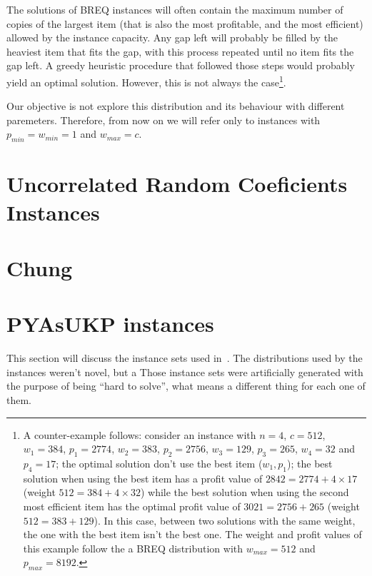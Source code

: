 The solutions of BREQ instances will often contain the maximum number of copies of the largest item (that is also the most profitable, and the most efficient) allowed by the instance capacity. Any gap left will probably be filled by the heaviest item that fits the gap, with this process repeated until no item fits the gap left. A greedy heuristic procedure that followed those steps would probably yield an optimal solution. However, this is not always the case\footnote{A counter-example follows: consider an instance with \(n = 4\), \(c = 512\), \(w_1 = 384\), \(p_1 = 2774\), \(w_2 = 383\), \(p_2 = 2756\), \(w_3 = 129\), \(p_3 = 265\), \(w_4 = 32\) and \(p_4 = 17\); the optimal solution don't use the best item (\(w_1, p_1\)); the best solution when using the best item has a profit value of \(2842 = 2774 + 4\times17\) (weight \(512 = 384 + 4\times32\)) while the best solution when using the second most efficient item has the optimal profit value of \(3021 = 2756 + 265\) (weight \(512 = 383 + 129\)). In this case, between two solutions with the same weight, the one with the best item isn't the best one. The weight and profit values of this example follow the a BREQ distribution with \(w_{max} = 512\) and \(p_{max} = 8192\).}.

Our objective is not explore this distribution and its behaviour with different paremeters. Therefore, from now on we will refer only to instances with \(p_{min} = w_{min} = 1\) and \(w_{max} = c\). 

\section{Uncorrelated Random Coeficients Instances}

\section{Chung}

\section{PYAsUKP instances}

This section will discuss the instance sets used in~\cite{pya}.
The distributions used by the instances weren't novel, but a 
Those instance sets were artificially generated with the purpose of being ``hard to solve'', what means a different thing for each one of them.


